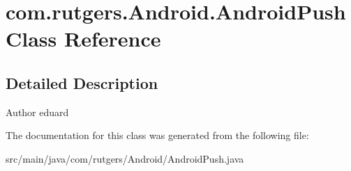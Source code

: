 \hypertarget{classcom_1_1rutgers_1_1Android_1_1AndroidPush}{}\section{com.\+rutgers.\+Android.\+Android\+Push Class Reference}
\label{classcom_1_1rutgers_1_1Android_1_1AndroidPush}


\subsection{Detailed Description}
\begin{DoxyAuthor}{Author}
eduard 
\end{DoxyAuthor}


The documentation for this class was generated from the following file\+:\begin{DoxyCompactItemize}
\item 
src/main/java/com/rutgers/\+Android/Android\+Push.\+java\end{DoxyCompactItemize}
